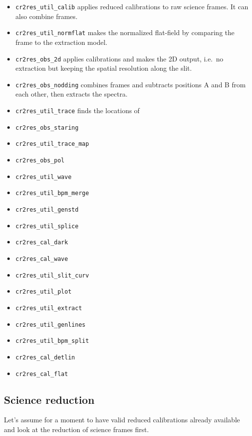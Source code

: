\begin{itemize}
\item \texttt{cr2res\_util\_calib} applies reduced calibrations to raw science frames. It can also combine frames.
\item \texttt{cr2res\_util\_normflat} makes the normalized flat-field by comparing the frame to the extraction model.
\item \texttt{cr2res\_obs\_2d} applies calibrations and makes the 2D output, i.e.~no extraction but keeping the spatial resolution along the slit.
\item \texttt{cr2res\_obs\_nodding} combines frames and subtracts positions A and B from each other, then extracts the spectra.
\item \texttt{cr2res\_util\_trace} finds the locations of 
\item \texttt{cr2res\_obs\_staring}
\item \texttt{cr2res\_util\_trace\_map}
\item \texttt{cr2res\_obs\_pol}
\item \texttt{cr2res\_util\_wave}
\item \texttt{cr2res\_util\_bpm\_merge}
\item \texttt{cr2res\_util\_genstd}
\item \texttt{cr2res\_util\_splice}
\item \texttt{cr2res\_cal\_dark}
\item \texttt{cr2res\_cal\_wave}
\item \texttt{cr2res\_util\_slit\_curv}
\item \texttt{cr2res\_util\_plot}
\item \texttt{cr2res\_util\_extract}
\item \texttt{cr2res\_util\_genlines}
\item \texttt{cr2res\_util\_bpm\_split}
\item \texttt{cr2res\_cal\_detlin}
\item \texttt{cr2res\_cal\_flat}
\end{itemize}



\subsection{Science reduction}
\label{sec:sci-reduc}
Let's assume for a moment to
have valid reduced calibrations already available and look at the reduction of science frames first.


